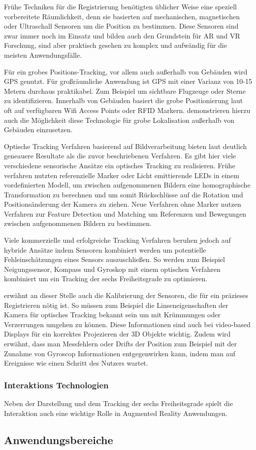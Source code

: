 Frühe Techniken für die Registrierung benötigten üblicher Weise eine speziell vorbereitete Räumlichkeit, denn sie basierten auf mechanischen, magnetischen oder Ultraschall Sensoren um die Position zu bestimmen. Diese Sensoren sind zwar immer noch im Einsatz und bilden auch den Grundstein für AR und VR Forschung, sind aber praktisch gesehen zu komplex und aufwändig für die meisten Anwendungsfälle. \citep{van2010survey} 

Für ein grobes Positions-Tracking, vor allem auch außerhalb von Gebäuden wird GPS genutzt. Für großräumliche Anwendung ist GPS mit einer Varianz von 10-15 Metern durchaus praktikabel. Zum Beispiel um sichtbare Flugzeuge oder Sterne zu identifizieren. Innerhalb von Gebäuden basiert die grobe Positionierung laut \citet{van2010survey} oft auf verfügbaren Wifi Access Points oder RFID Markern. \citet{lamarca2005place} demonstrieren hierzu auch die Möglichkeit diese Technologie für grobe Lokalisation außerhalb von Gebäuden einzusetzen.

Optische Tracking Verfahren basierend auf Bildverarbeitung bieten laut \citet{van2010survey} deutlich geneauere Resultate als die zuvor beschriebenen Verfahren. Es gibt hier viele verschiedene sensorische Ansätze ein optisches Tracking zu realisieren. Frühe verfahren nutzten referenzielle Marker oder Licht emittierende LEDs in einem vordefinierten Modell, um zwischen aufgenommenen Bildern eine homographische Transformation zu berechnen und um somit Rückschlüsse auf die Rotation und Positionsänderung der Kamera zu ziehen. Neue Verfahren ohne Marker nutzen Verfahren zur Feature Detection und Matching um Referenzen und Bewegungen zwischen aufgenommenen Bildern zu bestimmen.

Viele kommerzielle und erfolgreiche Tracking Verfahren beruhen jedoch auf hybride Ansätze indem Sensoren kombiniert werden um potentielle Fehleinschätzungen eines Sensors auszuschließen. So werden zum Beispiel Neigungssensor, Kompass und Gyroskop mit einem optischen Verfahren kombiniert um ein Tracking der sechs Freiheitsgrade zu optimieren. \citep{van2010survey}

\citet{azuma2001recent} erwähnt an dieser Stelle auch die Kalibrierung der Sensoren, die für ein präzieses Registrieren nötig ist. So müssen zum Beispiel die Linseneigenschaften der Kamera für optisches Tracking bekannt sein um mit Krümmungen oder Verzerrungen umgehen zu können. Diese Informationen sind auch bei video-based Displays für ein korrektes Projezieren der 3D Objekte wichtig. Zudem wird erwähnt, dass man Messfehlern oder Drifts der Position zum Beispiel mit der Zunahme von Gyroscop Informationen entgegenwirken kann, indem man auf Ereignisse wie einen Schritt des Nutzers wartet. \citep{azuma2001recent}

\subsubsection{Interaktions Technologien}

Neben der Darstellung und dem Tracking der sechs Freiheitsgrade spielt die Interaktion auch eine wichtige Rolle in Augmented Reality Anwendungen. 


\subsection{Anwendungsbereiche}
